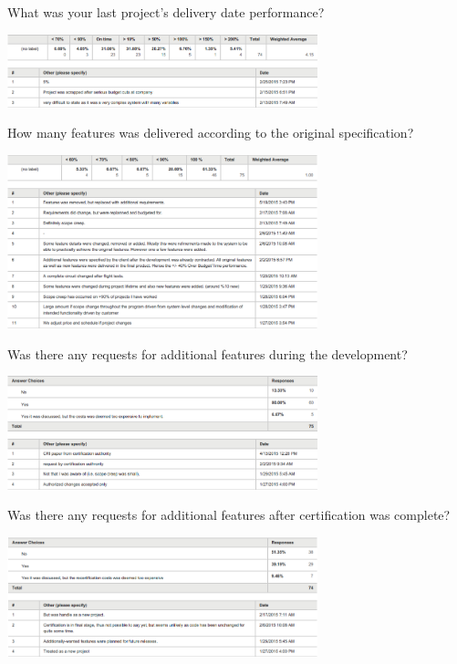 \documentclass{sig-alternate-05-2015}
\begin{document}
\begin{table}[t!]
	\centering
	\caption{What was your last project's delivery date performance?}
	\includegraphics[width=90mm]{What_was_your_last_projects_delivery_date_performance.png}
\end{table}

\begin{table}[t!]
	\centering
	\caption{How many features was delivered according to the original specification?}
	\includegraphics[width=90mm]{How_many_features_was_delivered_according_to_the_original_specification.png}
\end{table}

\begin{table}[t!]
	\centering
	\caption{Was there any requests for additional features during the development?}
	\includegraphics[width=90mm]{Was_there_any_requests_for_additional_features_during_the_development.png}
\end{table}

\begin{table}[t!]
	\centering
	\caption{Was there any requests for additional features after certification was complete?}
	\includegraphics[width=90mm]{Was_there_any_requests_for_additional_features_after_certification_was_complete.png}
\end{table}
\end{document}
